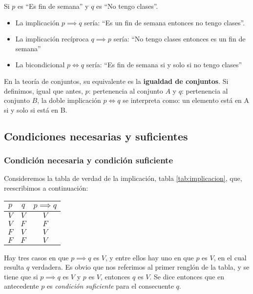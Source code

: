 \begin{fmd-example}
	Si $p$ es ``Es fin de semana'' y $q$ es ``No tengo clases''.
	\begin{itemize}
		\item La implicación $p \implies q$ sería: ``Es un fin de semana entonces no tengo clases''.
		\item La implicación recíproca $q \implies p$ sería: ``No tengo clases entonces es un fin de semana''
		\item La bicondicional $p \iff q$ sería: ``Es fin de semana si y solo si no tengo clases''
	\end{itemize}
\end{fmd-example}

En la teoría de conjuntos, su equivalente es la \textbf{igualdad de conjuntos}. Si definimos, igual que antes, $p$: pertenencia al conjunto $A$ y $q$: pertenencia al conjunto $B$, la doble implicación $p \iff q$ se interpreta como: un elemento está en A si y solo si está en B.

\subsection{Condiciones necesarias y suficientes}
 
\subsubsection{Condición necesaria y condición suficiente}

Consideremos la tabla de verdad de la implicación, tabla \ref{tab:implicacion}, que, reescribimos a continuación:

\begin{table}[H]
	\centering
	\begin{tabular}{|c|c|c|} \hline
		$p$ & $q$ & $p \implies q$ \\ \hline
		$V$ & $V$ & $V$ \\
		$V$ & $F$ & $F$ \\
		$F$ & $V$ & $V$ \\
		$F$ & $F$ & $V$ \\ \hline
	\end{tabular}
\end{table}

Hay tres casos en que $p \implies q$ es $V$, y entre ellos hay uno en que $p$ es $V$, en el cual resulta $q$ verdadera. Es obvio que nos referimos al primer renglón de la tabla, y se tiene que si $p \implies q$ es $V$ y $p$ es $V$, entonces $q$ es $V$. Se dice entonces que en antecedente $p$ es \textit{condición suficiente} para el consecuente $q$.

